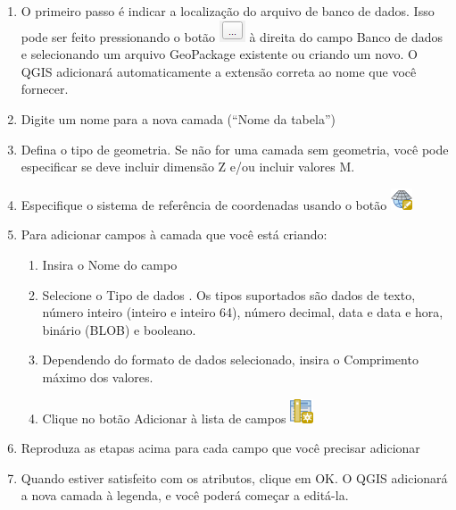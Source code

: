 \documentclass[
  portuguese,
]{krantz}
\providecommand{\tightlist}{%
  \setlength{\itemsep}{0pt}\setlength{\parskip}{0pt}}
\begin{document}
\begin{enumerate}
\def\labelenumi{\arabic{enumi}.}
\setcounter{enumi}{1}
\item
  O primeiro passo é indicar a localização do arquivo de banco de dados. Isso pode ser feito pressionando o botão \includegraphics{media/modulo7/database-file-location.png} à direita do campo Banco de dados e selecionando um arquivo GeoPackage existente ou criando um novo. O QGIS adicionará automaticamente a extensão correta ao nome que você fornecer.
\item
  Digite um nome para a nova camada (``Nome da tabela'')
\item
  Defina o tipo de geometria. Se não for uma camada sem geometria, você pode especificar se deve incluir dimensão Z e/ou incluir valores M.
\item
  Especifique o sistema de referência de coordenadas usando o botão \includegraphics{media/modulo7/mActionSetProjection.png}
\item
  Para adicionar campos à camada que você está criando:

  \begin{enumerate}
  \def\labelenumii{\arabic{enumii}.}
  \tightlist
  \item
    Insira o Nome do campo
  \item
    Selecione o Tipo de dados . Os tipos suportados são dados de texto, número inteiro (inteiro e inteiro 64), número decimal, data e data e hora, binário (BLOB) e booleano.
  \item
    Dependendo do formato de dados selecionado, insira o Comprimento máximo dos valores.
  \item
    Clique no botão Adicionar à lista de campos \includegraphics{media/modulo7/mActionNewAttribute.png}
  \end{enumerate}
\item
  Reproduza as etapas acima para cada campo que você precisar adicionar
\item
  Quando estiver satisfeito com os atributos, clique em OK. O QGIS adicionará a nova camada à legenda, e você poderá começar a editá-la.
\end{enumerate}
\end{document}
